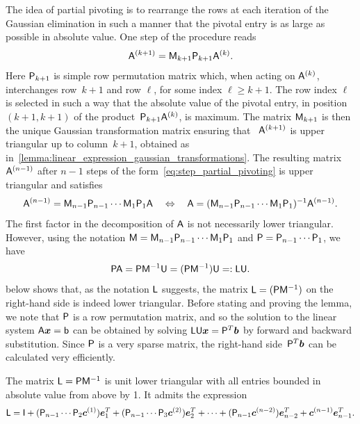 The idea of partial pivoting is to rearrange the rows at each iteration of the Gaussian elimination in such a manner that
the pivotal entry is as large as possible in absolute value.
One step of the procedure reads
\begin{equation}
    \label{eq:step_partial_pivoting}
    \mathsf A^{(k+1)} = \mathsf M_{k+1} \mathsf P_{k+1} \mathsf A^{(k)}.
\end{equation}
Here $\mathsf P_{k+1}$ is simple row permutation matrix which,
when acting on $\mathsf A^{(k)}$,
interchanges row~$k+1$ and row $\ell$,
for some index $\ell \geq k+1$.
The row index $\ell$ is selected in such a way that the absolute value of the pivotal entry,
in position $(k+1, k+1)$ of the product~$\mathsf P_{k+1} \mathsf A^{(k)}$, is maximum.
The matrix $\mathsf M_{k+1}$ is then the unique Gaussian transformation matrix ensuring that~%
$\mathsf A^{(k+1)}$ is upper triangular up to column~$k+1$,
obtained as in~\cref{lemma:linear_expression_gaussian_transformations}.
The resulting matrix $\mathsf A^{(n-1)}$ after $n-1$ steps of the form~\eqref{eq:step_partial_pivoting} is upper triangular and satisfies
\[
    \mathsf A^{(n-1)} = \mathsf M_{n-1} \mathsf P_{n-1} \dotsb \mathsf M_{1} \mathsf P_{1} \mathsf A
    \quad \Leftrightarrow \quad
     \mathsf A = (\mathsf M_{n-1} \mathsf P_{n-1} \dotsb \mathsf M_{1} \mathsf P_{1})^{-1} \mathsf A^{(n-1)}.
\]
The first factor in the decomposition of $\mathsf A$ is not necessarily lower triangular.
However, using the notation $\mathsf M = \mathsf M_{n-1} \mathsf P_{n-1} \dotsb \mathsf M_{1} \mathsf P_{1}$ and $\mathsf P = \mathsf P_{n-1} \dotsb \mathsf P_{1}$,
we have
\begin{equation}
    \label{eq:plu_decomposition}
    \mathsf P \mathsf A = \mathsf P \mathsf M^{-1} \mathsf U = (\mathsf P \mathsf M^{-1}) \mathsf U =: \mathsf L \mathsf U.
\end{equation}
 below shows that,
as the notation $\mathsf L$ suggests,
the matrix $\mathsf L = (\mathsf P \mathsf M^{-1})$ on the right-hand side is indeed lower triangular.
Before stating and proving the lemma,
we note that $\mathsf P$ is a row permutation matrix,
and so the solution to the linear system $\mathsf A \mathbf{\boldsymbol{x}} = \mathsf b$ can be obtained by solving $\mathsf L \mathsf U \mathbf{\boldsymbol{x}} = \mathsf P^T \mathbf{\boldsymbol{b}}$
by forward and backward substitution.
Since $\mathsf P$ is a very sparse matrix,
the right-hand side~$\mathsf P^T \mathbf{\boldsymbol{b}}$ can be calculated very efficiently.
\begin{lemma}
    \label{lemma:linear_matrix_l_pivoting}
    The matrix $\mathsf L = \mathsf P \mathsf M^{-1}$ is unit lower triangular
    with all entries bounded in absolute value from above by 1.
    It admits the expression
    \[
        \mathsf L
        = \mathsf I
        + (\mathsf P_{n-1} \dotsb \mathsf P_{2} \mathbf{\boldsymbol{c}}^{(1)}) \mathbf{\boldsymbol{e}}_{1}^T
        + (\mathsf P_{n-1} \dotsb \mathsf P_{3} \mathbf{\boldsymbol{c}}^{(2)}) \mathbf{\boldsymbol{e}}_{2}^T
        + \dotsb
        + (\mathsf P_{n-1} \mathbf{\boldsymbol{c}}^{(n-2)}) \mathbf{\boldsymbol{e}}_{n-2}^T
        + \mathbf{\boldsymbol{c}}^{(n-1)} \mathbf{\boldsymbol{e}}_{n-1}^T.
    \]
\end{lemma}
